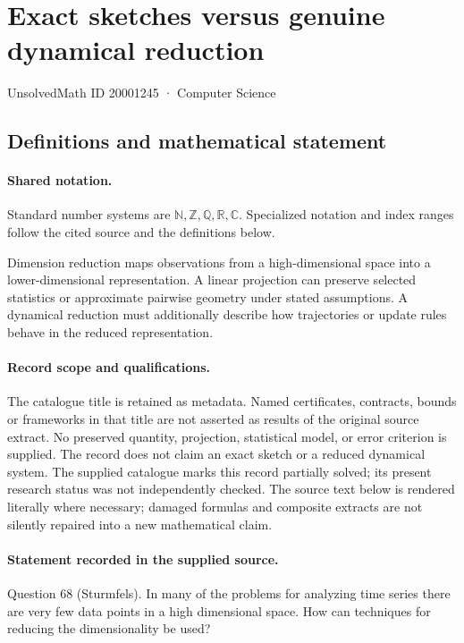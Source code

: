 \documentclass[11pt]{article}
\begin{document}
\setcounter{section}{20001244}
\section{Exact sketches versus genuine dynamical reduction}\label{20001245}
{\small\sffamily UnsolvedMath ID 20001245 · Computer Science}
\subsection{Definitions and mathematical statement}

\paragraph{Shared notation.}Standard number systems are $\mathbb N,\mathbb Z,\mathbb Q,\mathbb R,\mathbb C$. Specialized notation and index ranges follow the cited source and the definitions below.


Dimension reduction maps observations from a high-dimensional space into a lower-dimensional representation. A linear projection can preserve selected statistics or approximate pairwise geometry under stated assumptions. A dynamical reduction must additionally describe how trajectories or update rules behave in the reduced representation.
\paragraph{Record scope and qualifications.}
The catalogue title is retained as metadata. Named certificates, contracts, bounds or frameworks in that title are not asserted as results of the original source extract.
No preserved quantity, projection, statistical model, or error criterion is supplied. The record does not claim an exact sketch or a reduced dynamical system. The supplied catalogue marks this record partially solved; its present research status was not independently checked.
The source text below is rendered literally where necessary; damaged formulas and composite extracts are not silently repaired into a new mathematical claim.
\paragraph{Statement recorded in the supplied source.}
Question 68 (Sturmfels). In many of the problems for analyzing time series there are very few data points in a high dimensional space. How can techniques for reducing the dimensionality be used?
\end{document}
